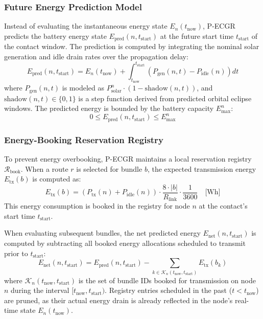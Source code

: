 \documentclass[journal,twocolumn]{IEEEtran}
\newcommand{\pecgr}{\textsf{P-ECGR}}
\begin{document}
\subsubsection{Future Energy Prediction Model}
Instead of evaluating the instantaneous energy state $E_n(t_{\text{now}})$, \pecgr{} predicts the battery energy state $E_{\text{pred}}(n, t_{\text{start}})$ at the future start time $t_{\text{start}}$ of the contact window. The prediction is computed by integrating the nominal solar generation and idle drain rates over the propagation delay:
\begin{equation}
    E_{\text{pred}}(n, t_{\text{start}}) = E_n(t_{\text{now}}) + \int_{t_{\text{now}}}^{t_{\text{start}}} \left( P_{\text{gen}}(n, t) - P_{\text{idle}}(n) \right) dt
\end{equation}
where $P_{\text{gen}}(n, t)$ is modeled as $P_{\text{solar}}^n \cdot (1 - \text{shadow}(n, t))$, and $\text{shadow}(n, t) \in \{0, 1\}$ is a step function derived from predicted orbital eclipse windows. The predicted energy is bounded by the battery capacity $E_{\max}^n$:
\begin{equation}
    0 \leq E_{\text{pred}}(n, t_{\text{start}}) \leq E_{\max}^n
\end{equation}

\subsubsection{Energy-Booking Reservation Registry}
To prevent energy overbooking, \pecgr{} maintains a local reservation registry $\mathcal{R}_{\text{book}}$. When a route $r$ is selected for bundle $b$, the expected transmission energy $E_{\text{tx}}(b)$ is computed as:
\begin{equation}
    E_{\text{tx}}(b) = \left( P_{\text{tx}}(n) + P_{\text{idle}}(n) \right) \cdot \frac{8 \cdot |b|}{R_{\text{link}}} \cdot \frac{1}{3600} \quad \text{[Wh]}
\end{equation}
This energy consumption is booked in the registry for node $n$ at the contact's start time $t_{\text{start}}$.

When evaluating subsequent bundles, the net predicted energy $E_{\text{net}}(n, t_{\text{start}})$ is computed by subtracting all booked energy allocations scheduled to transmit prior to $t_{\text{start}}$:
\begin{equation}
    E_{\text{net}}(n, t_{\text{start}}) = E_{\text{pred}}(n, t_{\text{start}}) - \sum_{k \in \mathcal{K}_n(t_{\text{now}}, t_{\text{start}})} E_{\text{tx}}(b_k)
\end{equation}
where $\mathcal{K}_n(t_{\text{now}}, t_{\text{start}})$ is the set of bundle IDs booked for transmission on node $n$ during the interval $[t_{\text{now}}, t_{\text{start}})$. Registry entries scheduled in the past ($t < t_{\text{now}}$) are pruned, as their actual energy drain is already reflected in the node's real-time state $E_n(t_{\text{now}})$.
\end{document}
